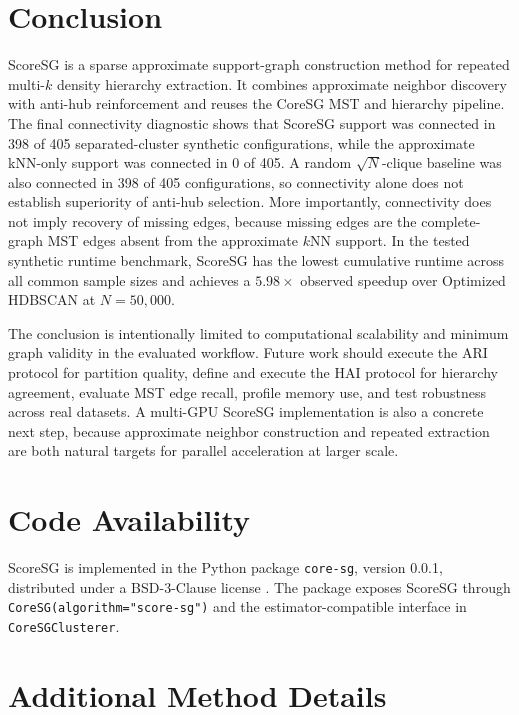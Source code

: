 \documentclass[11pt]{article}
\begin{document}
\section{Conclusion}

ScoreSG is a sparse approximate support-graph construction method for repeated multi-\(k\) density hierarchy extraction. It combines approximate neighbor discovery with anti-hub reinforcement and reuses the CoreSG MST and hierarchy pipeline. The final connectivity diagnostic shows that ScoreSG support was connected in 398 of 405 separated-cluster synthetic configurations, while the approximate kNN-only support was connected in 0 of 405. A random \(\sqrt{N}\)-clique baseline was also connected in 398 of 405 configurations, so connectivity alone does not establish superiority of anti-hub selection. More importantly, connectivity does not imply recovery of missing edges, because missing edges are the complete-graph MST edges absent from the approximate \(k\)NN support. In the tested synthetic runtime benchmark, ScoreSG has the lowest cumulative runtime across all common sample sizes and achieves a \(5.98\times\) observed speedup over Optimized HDBSCAN at \(N=50{,}000\).

The conclusion is intentionally limited to computational scalability and minimum graph validity in the evaluated workflow. Future work should execute the ARI protocol for partition quality, define and execute the HAI protocol for hierarchy agreement, evaluate MST edge recall, profile memory use, and test robustness across real datasets. A multi-GPU ScoreSG implementation is also a concrete next step, because approximate neighbor construction and repeated extraction are both natural targets for parallel acceleration at larger scale.

\section*{Code Availability}

ScoreSG is implemented in the Python package \texttt{core-sg}, version 0.0.1, distributed under a BSD-3-Clause license \citep{coresgsoftware}. The package exposes ScoreSG through \texttt{CoreSG(algorithm="score-sg")} and the estimator-compatible interface in \texttt{CoreSGClusterer}.

\appendix

\section{Additional Method Details}
\end{document}
